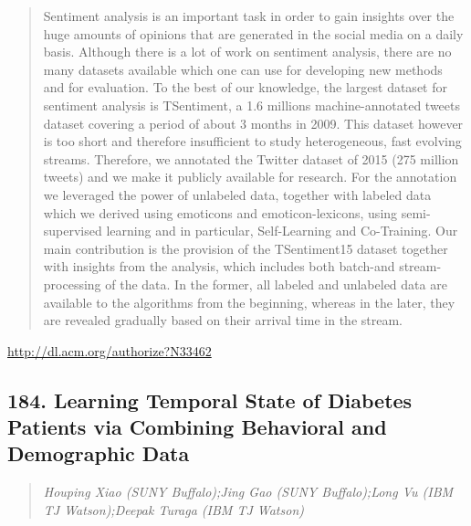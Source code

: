 \documentclass{article}
\begin{document}
\begin{quote}
Sentiment analysis is an important task in order to gain insights over the huge amounts of opinions that are generated in the social media on a daily basis. Although there is a lot of work on sentiment analysis, there are no many datasets available which one can use for developing new methods and for evaluation. To the best of our knowledge, the largest dataset for sentiment analysis is TSentiment, a 1.6 millions machine-annotated tweets dataset covering a period of about 3 months in 2009. This dataset however is too short and therefore insufficient to study heterogeneous, fast evolving streams. Therefore, we annotated the Twitter dataset of 2015 (275 million tweets) and we make it publicly available for research. For the annotation we leveraged the power of unlabeled data, together with labeled data which we derived using emoticons and emoticon-lexicons, using semi-supervised learning and in particular, Self-Learning and Co-Training. Our main contribution is the provision of the TSentiment15 dataset together with insights from the analysis, which includes both batch-and stream-processing of the data. In the former, all labeled and unlabeled data are available to the algorithms from the beginning, whereas in the later, they are revealed gradually based on their arrival time in the stream.
\end{quote}

\href{http://dl.acm.org/authorize?N33462}{http://dl.acm.org/authorize?N33462}

\subsection{184. Learning Temporal State of Diabetes Patients via Combining Behavioral and Demographic Data}

\begin{quote}
\footnotesize{\textit{Houping Xiao (SUNY Buffalo);Jing Gao (SUNY Buffalo);Long Vu (IBM TJ Watson);Deepak Turaga (IBM TJ Watson)}}

\end{quote}
\end{document}
